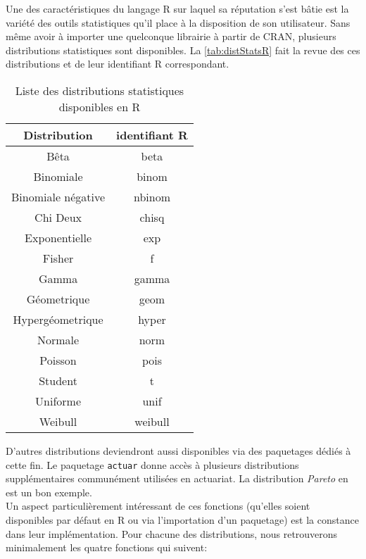 Une des caractéristiques du langage R sur laquel sa réputation s'est bâtie est la variété des outils statistiques qu'il place à la disposition de son utilisateur. Sans même avoir à importer une quelconque librairie à partir de CRAN, plusieurs distributions statistiques sont disponibles. La \autoref{tab:distStatsR} fait la revue des ces distributions et de leur identifiant R correspondant. \cite{distStatsR} \\

\begin{table}[h]
	\centering
	\begin{tabular}{cc}
		\textbf{Distribution} & \textbf{identifiant R} \\
		\hline
		Bêta & beta \\
		Binomiale & binom \\
		Binomiale négative & nbinom \\
		Chi Deux & chisq \\
		Exponentielle & exp \\
		Fisher & f \\
		Gamma & gamma \\
		Géometrique & geom \\
		Hypergéometrique & hyper \\
		Normale & norm \\
		Poisson & pois \\
		Student & t \\
		Uniforme & unif \\
		Weibull & weibull	
	\end{tabular}
	\caption{Liste des distributions statistiques disponibles en R}
\end{table}
\label{tab:distStatsR}

D'autres distributions deviendront aussi disponibles via des paquetages dédiés à cette fin. Le paquetage \texttt{actuar} \cite{Rpackage:actuar} donne accès à plusieurs distributions supplémentaires communément utilisées en actuariat. La distribution \emph{Pareto} en est un bon exemple. \\

Un aspect particulièrement intéressant de ces fonctions (qu'elles soient disponibles par défaut en R ou via l'importation d'un paquetage) est la constance dans leur implémentation. Pour chacune des distributions, nous retrouverons minimalement les quatre fonctions qui suivent: \\

